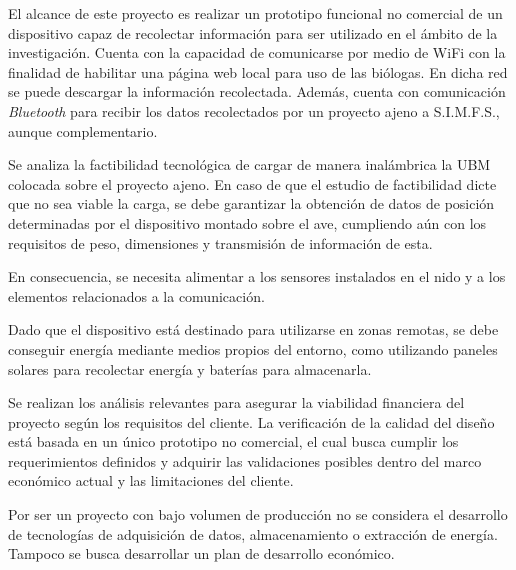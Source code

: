 El alcance de este proyecto es realizar un prototipo funcional no comercial de un dispositivo capaz de recolectar información para ser utilizado en el ámbito de la investigación. Cuenta con la capacidad de comunicarse por medio de WiFi con la finalidad de habilitar una página web local para uso de las biólogas. En dicha red se puede descargar la información recolectada. Además, cuenta con comunicación \textit{Bluetooth} para recibir los datos recolectados por un proyecto ajeno a S.I.M.F.S., aunque complementario.

Se analiza la factibilidad tecnológica de cargar de manera inalámbrica la UBM colocada sobre el proyecto ajeno. En caso de que el estudio de factibilidad dicte que no sea viable la carga, se debe garantizar la obtención de datos de posición determinadas por el dispositivo montado sobre el ave, cumpliendo aún con los requisitos de peso, dimensiones y transmisión de información de esta.

En consecuencia, se necesita alimentar a los sensores instalados en el nido y a los elementos relacionados a la comunicación.

Dado que el dispositivo está destinado para utilizarse en zonas remotas, se debe conseguir energía mediante medios propios del entorno, como utilizando paneles solares para recolectar energía y baterías para almacenarla.

Se realizan los análisis relevantes para asegurar la viabilidad financiera del proyecto según los requisitos del cliente. La verificación de la calidad del diseño está basada en un único prototipo no comercial, el cual busca cumplir los requerimientos definidos y adquirir las validaciones posibles dentro del marco económico actual y las limitaciones del cliente. 

Por ser un proyecto con bajo volumen de producción no se considera el desarrollo de tecnologías de adquisición de datos, almacenamiento o extracción de energía. Tampoco se busca desarrollar un plan de desarrollo económico.
